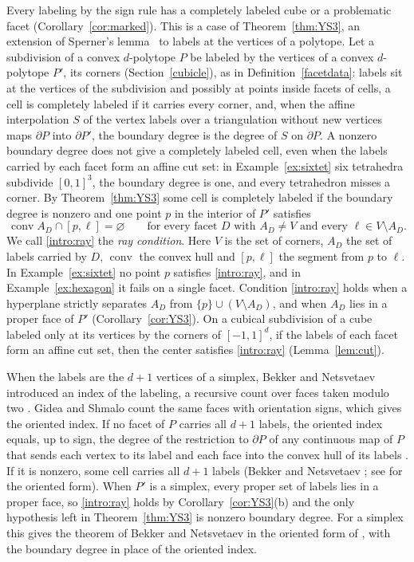\documentclass[11pt]{amsart}
\theoremstyle{definition}
\theoremstyle{remark}
\numberwithin{equation}{section}
\DeclareMathOperator{\conv}{conv}
\begin{document}
Every labeling by the sign rule has a completely labeled cube or a problematic facet (Corollary~\ref{cor:marked}). This is a case of Theorem~\ref{thm:YS3}, an extension of Sperner's lemma~\cite{Sperner1928} to labels at the vertices of a polytope. Let a subdivision of a convex $d$-polytope $P$ be labeled by the vertices of a convex $d$-polytope $P'$, its corners (Section~\ref{cubicle}), as in Definition~\ref{facetdata}: labels sit at the vertices of the subdivision and possibly at points inside facets of cells, a cell is completely labeled if it carries every corner, and, when the affine interpolation $S$ of the vertex labels over a triangulation without new vertices maps $\partial P$ into $\partial P'$, the boundary degree is the degree of $S$ on $\partial P$. A nonzero boundary degree does not give a completely labeled cell, even when the labels carried by each facet form an affine cut set: in Example~\ref{ex:sixtet} six tetrahedra subdivide $[0,1]^3$, the boundary degree is one, and every tetrahedron misses a corner. By Theorem~\ref{thm:YS3} some cell is completely labeled if the boundary degree is nonzero and one point $p$ in the interior of $P'$ satisfies
\begin{equation}\label{intro:ray}
\conv A_D\cap[p,\ell]=\varnothing\qquad\text{for every facet $D$ with $A_D\ne V$ and every $\ell\in V\setminus A_D$}.
\end{equation}
We call \eqref{intro:ray} the \emph{ray condition}. Here $V$ is the set of corners, $A_D$ the set of labels carried by $D$, $\conv$ the convex hull and $[p,\ell]$ the segment from $p$ to $\ell$. In Example~\ref{ex:sixtet} no point $p$ satisfies \eqref{intro:ray}, and in Example~\ref{ex:hexagon} it fails on a single facet. Condition \eqref{intro:ray} holds when a hyperplane strictly separates $A_D$ from $\{p\}\cup(V\setminus A_D)$, and when $A_D$ lies in a proper face of $P'$ (Corollary~\ref{cor:YS3}). On a cubical subdivision of a cube labeled only at its vertices by the corners of $[-1,1]^d$, if the labels of each facet form an affine cut set, then the center satisfies \eqref{intro:ray} (Lemma~\ref{lem:cut}).

When the labels are the $d+1$ vertices of a simplex, Bekker and Netsvetaev \cite{Bekker1995} introduced an index of the labeling, a recursive count over faces taken modulo two \cite[Remark~2.2]{GS1}. Gidea and Shmalo \cite[\S2.2]{GS1} count the same faces with orientation signs, which gives the oriented index. If no facet of $P$ carries all $d+1$ labels, the oriented index equals, up to sign, the degree of the restriction to $\partial P$ of any continuous map of $P$ that sends each vertex to its label and each face into the convex hull of its labels \cite[Proposition~2.4]{GS1}. If it is nonzero, some cell carries all $d+1$ labels (Bekker and Netsvetaev \cite{Bekker1995}; see \cite[Theorem~2.6]{GS1} for the oriented form). When $P'$ is a simplex, every proper set of labels lies in a proper face, so \eqref{intro:ray} holds by Corollary~\ref{cor:YS3}(b) and the only hypothesis left in Theorem~\ref{thm:YS3} is nonzero boundary degree. For a simplex this gives the theorem of Bekker and Netsvetaev in the oriented form of \cite[Theorem~2.6]{GS1}, with the boundary degree in place of the oriented index.
\end{document}
